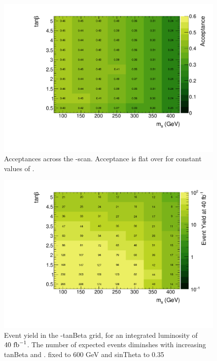 \begin{figure}
\label{fig:monoz_ll_tanbma_acceptance}
\includegraphics[width=\textwidth]{texinputs/04_grid/figures/monoz/leptonic/tanbma_ae_ll.pdf}
\caption{Acceptances across the \ma-\tanb scan.  Acceptance is flat over \tanb for constant values of \ma.}
\end{figure}

\begin{figure}
\includegraphics[width=\textwidth]{texinputs/04_grid/figures/monoz/leptonic/tanbma_yield_ll.pdf}
\caption{Event yield in the \ma-tanBeta grid, for an integrated luminosity of $40~\rm{fb}^{-1}$.  The number of expected events diminshes with increasing tanBeta and \ma.  \mA fixed to 600 GeV and sinTheta to 0.35}
\end{figure}


